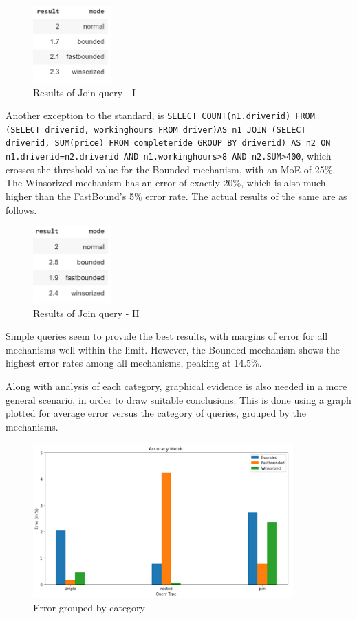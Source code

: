 \documentclass[acmsmall]{acmart}
\begin{document}
\begin{figure}[htp]
    \centering
    \includegraphics[width=3cm]{Fig 4.4.6.png}
    \caption{Results of Join query - I}
    \label{Fig:4.4.6}
\end{figure}

Another exception to the standard, is \texttt{SELECT COUNT(n1.driver\textunderscore id) FROM (SELECT driver\textunderscore id, working\textunderscore hours FROM driver)AS n1 JOIN (SELECT driver\textunderscore id, SUM(price) FROM completeride GROUP BY driver\textunderscore id) AS n2 ON n1.driver\textunderscore id=n2.driver\textunderscore id AND n1.working\textunderscore hours>8 AND n2.SUM>400}, which crosses the threshold value for the Bounded mechanism, with an MoE of 25\%. The Winsorized mechanism has an error of exactly 20\%, which is also much higher than the FastBound’s 5\% error rate.  The actual results of the same are as follows.

\begin{figure}[htp]
    \centering
    \includegraphics[width=3cm]{Fig 4.4.7.png}
    \caption{Results of Join query - II}
    \label{Fig:4.4.7}
\end{figure}

Simple queries seem to provide the best results, with margins of error for all mechanisms well within the limit. However, the Bounded mechanism shows the highest error rates among all mechanisms, peaking at 14.5\%.

Along with analysis of each category, graphical evidence is also needed in a more general scenario, in order to draw suitable conclusions. This is done using a graph plotted for average error versus the category of queries, grouped by the mechanisms.

\begin{figure}[htp]
    \centering
    \includegraphics[width=10cm]{Fig 4.4.8.png}
    \caption{Error grouped by category}
    \label{Fig:4.4.8}
\end{figure}
\end{document}
